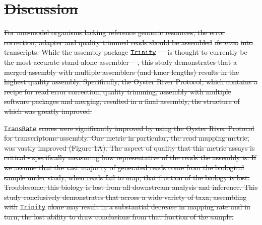 \documentclass[10pt,letterpaper]{article}
\providecommand{\DIFdeltex}[1]{{\protect\color{red}\sout{#1}}}                      %
\providecommand{\DIFdel}[1]{\texorpdfstring{\DIFdeltex{#1}}{}} %
\begin{document}
\textbf{%
} %

\section{\DIFdel{Discussion}}
\addtocounter{section}{-1}%

\DIFdel{For non-model organisms lacking reference genomic resources, the error correction, adapter and quality trimmed reads should be assembled }\textit{\DIFdel{de novo}} %
\DIFdel{into transcripts. While the assembly package }\texttt{\DIFdel{Trinity}} %
\DIFdel{\mbox{%
\citep{Haas:2013jq} }\hspace{0pt}%
is thought to currently be the most accurate stand-alone assembler \mbox{%
\citep{Li:2014cm}}\hspace{0pt}%
, this study demonstrates that a merged assembly with multiple assemblers (and kmer lengths) results in the highest quality assembly. Specifically, the Oyster River Protocol, which contains a recipe for read error correction, quality trimming, assembly with multiple software packages and merging, resulted in a final assembly, the structure of which was greatly improved. 
}%

\texttt{\DIFdel{TransRate}} %
\DIFdel{scores were significantly improved by using the Oyster River Protocol for transcriptome assembly. One metric in particular, the read mapping metric, was vastly improved (Figure 1A). The aspect of quality that this metric assays is critical - specifically measuring how representative of the reads the assembly is. If we assume that the vast majority of generated reads come from the biological sample under study, when reads fail to map, that fraction of the biology is lost. Troublesome, this biology is lost from all downstream analysis and inference. This study conclusively demonstrates that across a wide variety of taxa, assembling with }\texttt{\DIFdel{Trinity}} %
\DIFdel{alone may result in a substantial decrease in mapping rate and in turn, the lost ability to draw conclusions from that fraction of the sample. 
}%
\end{document}
